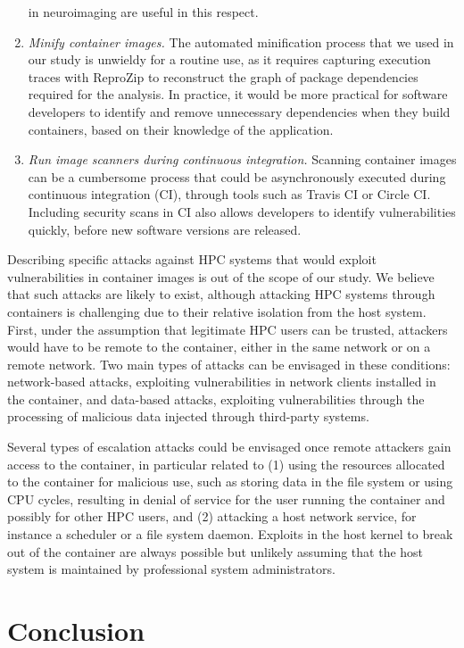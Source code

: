\documentclass[a4paper,num-refs]{oup-contemporary}
\begin{document}
\begin{enumerate}[leftmargin=0pt,itemindent=*]
in neuroimaging are useful in this respect.
\item \emph{Minify container images.} The automated minification
process that we used in our study is unwieldy for a routine use, as it
requires capturing execution traces with ReproZip to reconstruct the graph
of package dependencies required for the analysis. In practice, it would be
more practical for software developers to identify and remove unnecessary
dependencies when they build containers, based on their knowledge of the
application.
\item \emph{Run image scanners during continuous integration.} Scanning
container images can be a cumbersome process that
could be asynchronously executed during continuous integration (CI),
through tools such as Travis CI or Circle CI. Including security scans in
CI also allows developers to identify vulnerabilities quickly,
before new software versions are released.
\end{enumerate}

Describing specific attacks against HPC systems that would exploit
vulnerabilities in container images is out of the scope of our study. We
believe that such attacks are likely to exist, although attacking HPC
systems through containers is challenging due to their relative isolation
from the host system. First, under the assumption that legitimate HPC
users can be trusted, attackers would have to be remote to the container,
either in the same network or on a remote network. Two main types of
attacks can be envisaged in these conditions: network-based attacks,
exploiting vulnerabilities in network clients installed in the container,
and data-based attacks, exploiting vulnerabilities through the processing
of malicious data injected through third-party systems.

Several types of escalation attacks could be envisaged once remote
attackers gain access to the container, in particular related to (1) using
the resources allocated to the container for malicious use, such as storing
data in the file system or using CPU cycles, resulting in denial of service
for the user running the container and possibly for other HPC users, and
(2) attacking a host network service, for instance a scheduler or a file
system daemon. Exploits in the host kernel to break out of the container
are always possible but unlikely assuming that the host system is
maintained by professional system administrators.

\section{Conclusion}
\end{document}
